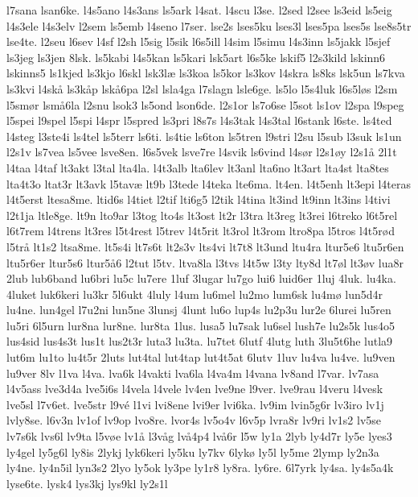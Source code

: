l7sana
lsan6ke.
l4s5ano
l4s3ans
ls5ark
l4sat.
l4scu
l3se.
l2sed
l2see
ls3eid
ls5eig
l4s3ele
l4s3elv
l2sem
ls5emb
l4seno
l7ser.
lse2s
lses5ku
lses3l
lses5pa
lses5s
lse8s5tr
lse4te.
l2seu
l6sev
l4sf
l2sh
l5sig
l5sik
l6s5ill
l4sim
l5simu
l4s3inn
ls5jakk
l5sjef
ls3jeg
ls3jen
8lsk.
ls5kabi
l4s5kan
ls5kari
lsk5art
l6s5ke
lskif5
l2s3kild
lskinn6
lskinns5
ls1kjed
ls3kjo
l6skl
lsk3l^^e6
ls3koa
ls5kor
ls3kov
l4skra
ls8ks
lsk5un
ls7kva
ls3kvi
l4sk^^e5
ls3k^^e5p
lsk^^e56pa
l2sl
lsla4ga
l7slagn
lsle6ge.
ls5lo
l5s4luk
l6s5l^^f8s
l2sm
l5sm^^f8r
lsm^^e56la
l2snu
lsok3
ls5ond
lson6de.
l2s1or
ls7o6se
l5sot
ls1ov
l2spa
l9speg
l5spei
l9spel
l5spi
l4spr
l5spred
ls3pri
l8s7s
l4s3tak
l4s3tal
l6stank
l6ste.
ls4ted
l4steg
l3ste4i
ls4tel
ls5terr
ls6ti.
ls4tie
ls6ton
ls5tren
l9stri
l2su
l5sub
l3suk
ls1un
l2s1v
ls7vea
ls5vee
lsve8en.
l6s5vek
lsve7re
l4svik
ls6vind
l4s^^f8r
l2s1^^f8y
l2s1^^e5
2l1t
l4taa
l4taf
lt3akt
l3tal
lta4la.
l4t3alb
lta6lev
lt3anl
lta6no
lt3art
lta4st
lta8tes
lta4t3o
ltat3r
lt3avk
l5tav^^e6
lt9b
l3tede
l4teka
lte6ma.
lt4en.
l4t5enh
lt3epi
l4teras
l4t5erst
ltesa8me.
ltid6s
l4tiet
l2tif
lti6g5
l2tik
l4tina
lt3ind
lt9inn
lt3ins
l4tivi
l2t1ja
ltle8ge.
lt9n
lto9ar
l3tog
lto4s
lt3ost
lt2r
l3tra
lt3reg
lt3rei
l6treko
l6t5rel
l6t7rem
l4trens
lt3res
l5t4rest
l5trev
l4t5rit
lt3rol
lt3rom
ltro8pa
l5tros
l4t5r^^f8d
l5tr^^e5
lt1s2
ltsa8me.
lt5s4i
lt7s6t
lt2s3v
lts4vi
lt7t8
lt3und
ltu4ra
ltur5e6
ltu5r6en
ltu5r6er
ltur5s6
ltur5^^e56
l2tut
l5tv.
ltva8la
l3tvs
l4t5w
l3ty
lty8d
lt7^^f8l
lt3^^f8v
lua8r
2lub
lub6band
lu6bri
lu5c
lu7ere
1luf
3lugar
lu7go
lui6
luid6er
1luj
4luk.
lu4ka.
4luket
luk6keri
lu3kr
5l6ukt
4luly
l4um
lu6mel
lu2mo
lum6sk
lu4m^^f8
lun5d4r
lu4ne.
lun4gel
l7u2ni
lun5ne
3lunsj
4lunt
lu6o
lup4s
lu2p3u
lur2e
6lurei
lu5ren
lu5ri
6l5urn
lur8na
lur8ne.
lur8ta
1lus.
lusa5
lu7sak
lu6sel
lush7e
lu2s5k
lus4o5
lus4sid
lus4s3t
lus1t
lus2t3r
luta3
lu3ta.
lu7tet
6lutf
4lutg
luth
3lu5t6he
lutla9
lut6m
lu1to
lu4t5r
2luts
lut4tal
lut4tap
lut4t5at
6lutv
1luv
lu4va
lu4ve.
lu9ven
lu9ver
8lv
l1va
l4va.
lva6k
l4vakti
lva6la
l4va4m
l4vana
lv8and
l7var.
lv7asa
l4v5ass
lve3d4a
lve5i6s
l4vela
l4vele
lv4en
lve9ne
l9ver.
lve9rau
l4veru
l4vesk
lve5sl
l7v6et.
lve5str
l9v^^e9
l1vi
lvi8ene
lvi9er
lvi6ka.
lv9im
lvin5g6r
lv3iro
lv1j
lvly8se.
l6v3n
lv1of
lv9op
lvo8re.
lvor4s
lv5o4v
l6v5p
lvra8r
lv9ri
lv1s2
lv5se
lv7s6k
lvs6l
lv9ta
l5v^^f8e
lv1^^e5
l3v^^e5g
lv^^e54p4
lv^^e56r
l5w
ly1a
2lyb
ly4d7r
ly5e
lyes3
ly4gel
ly5g6l
ly8is
2lykj
lyk6keri
ly5ku
ly7kv
6lyk^^f8
ly5l
ly5me
2lymp
ly2n3a
ly4ne.
ly4n5il
lyn3s2
2lyo
ly5ok
ly3pe
ly1r8
ly8ra.
ly6re.
6l7yrk
ly4sa.
ly4s5a4k
lyse6te.
lysk4
lys3kj
lys9kl
ly2s1l

